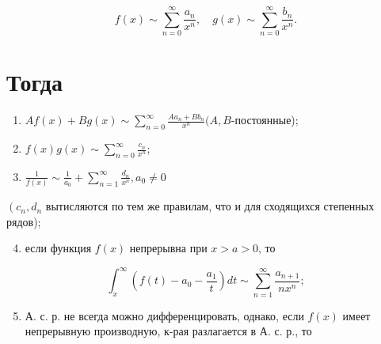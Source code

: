 \documentclass[10pt]{article}
\begin{document}
\[

f(x) \sim \sum_{n=0}^{\infty} \frac{a_{n}}{x^{n}}, \quad g(x) \sim \sum_{n=0}^{\infty} \frac{b_{n}}{x^{n}} .

\]



\section{Тогда}

\begin{enumerate}

  \item $A f(x)+B g(x) \sim \sum_{n=0}^{\infty} \frac{A a_{n}+B b_{n}}{x^{n}}(A, B$-постоянные);



  \item $f(x) g(x) \sim \sum_{n=0}^{\infty} \frac{c_{n}}{x^{n}}$;



  \item $\frac{1}{f(x)} \sim \frac{1}{a_{0}}+\sum_{n=1}^{\infty} \frac{d_{n}}{x^{n}}, a_{0} \neq 0$



\end{enumerate}



$\left(c_{n}, d_{n}\right.$ вытисляются по тем же правилам, что и для сходящихся степенных рядов);



\begin{enumerate}

  \setcounter{enumi}{3}

  \item если функция $f(x)$ непрерывна при $x>a>0$, то

\end{enumerate}



\[

\int_{x}^{\infty}\left(f(t)-a_{0}-\frac{a_{1}}{t}\right) d t \sim \sum_{n=1}^{\infty} \frac{a_{n+1}}{n x^{n}} ;

\]



\begin{enumerate}

  \setcounter{enumi}{4}

  \item А. с. р. не всегда можно дифференцировать, однако, если $f(x)$ имеет непрерывную производную, к-рая разлагается в А. с. р., то

\end{enumerate}
\end{document}
